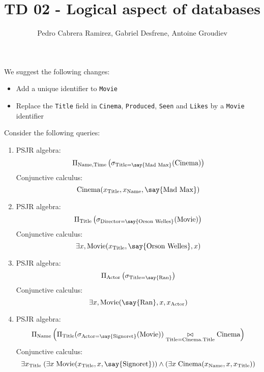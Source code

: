 \documentclass{../../cs-classes/cs-classes}
\title{TD 02 - Logical aspect of databases}
\author{Pedro Cabrera Ramirez, Gabriel Desfrene, Antoine Groudiev}
\newcommand*{\cinema}{\textnormal{Cinema}}
\newcommand*{\titl}{\textnormal{Title}}
\newcommand*{\movie}{\textnormal{Movie}}
\newcommand*{\name}{\textnormal{Name}}
\newcommand*{\tim}{\textnormal{Time}}
\newcommand*{\actor}{\textnormal{Actor}}
\newcommand*{\director}{\textnormal{Director}}
\newcommand{\constant}[1]{\textnormal{\say{#1}}}
\begin{document}
\begin{exercise}
    We suggest the following changes:
    \begin{itemize}
        \item Add a unique identifier to \texttt{Movie}
        \item Replace the \texttt{Title} field in \texttt{Cinema}, \texttt{Produced}, \texttt{Seen} and \texttt{Likes} by a \texttt{Movie} identifier
    \end{itemize}
\end{exercise}

\begin{exercise}
    Consider the following queries:
    \begin{enumerate}
        \item PSJR algebra:
        \begin{equation*}
            \Pi_{\name, \tim}\left(\sigma_{\titl=\constant{Mad Max}}(\cinema)\right)
        \end{equation*}
        Conjunctive calculus:
        \begin{equation*}
            \cinema(x_{\titl}, x_{\name}, \constant{Mad Max})
        \end{equation*}

        \item PSJR algebra:
        \begin{equation*}
            \Pi_{\titl}\left(\sigma_{\director =\constant{Orson Welles}}(\movie)\right)
        \end{equation*}
        Conjunctive calculus:
        \begin{equation*}
            \exists x, \movie(x_{\titl}, \constant{Orson Welles}, x)
        \end{equation*}

        \item PSJR algebra:
        \begin{equation*}
            \Pi_{\actor}\left(\sigma_{\titl=\constant{Ran}}\right)
        \end{equation*}
        Conjunctive calculus:
        \begin{equation*}
            \exists x, \movie(\constant{Ran}, x, x_{\actor})
        \end{equation*}

        \item PSJR algebra:
        \begin{equation*}
            \Pi_{\name}\left(\Pi_{\titl}(\sigma_{\actor=\constant{Signoret}}(\movie))\underset{\titl=\cinema.\titl}{\bowtie}\cinema\right)
        \end{equation*}
        Conjunctive calculus:
        \begin{equation*}
            \exists x_{\titl} \;(\exists x \;\movie(x_{\titl}, x, \constant{Signoret})) \land (\exists x \; \cinema(x_{\name}, x, x_{\titl}))
        \end{equation*}


\end{enumerate}
\end{exercise}
\end{document}
